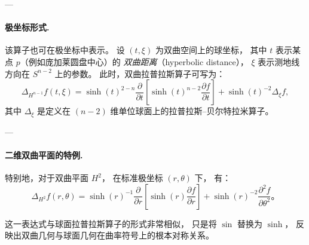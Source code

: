 ---

\paragraph{极坐标形式.}
该算子也可在极坐标中表示。
设 $(t, \xi)$ 为双曲空间上的球坐标，
其中 $t$ 表示某点 $p$（例如庞加莱圆盘中心）的
\emph{双曲距离}（hyperbolic distance），
$\xi$ 表示测地线方向在 $S^{n-2}$ 上的参数。
此时，双曲拉普拉斯算子可写为：
\[
\Delta_{H^{n-1}} f(t, \xi)
= \sinh(t)^{2-n}
  \frac{\partial}{\partial t}
  \left[ \sinh(t)^{n-2} \frac{\partial f}{\partial t} \right]
+ \sinh(t)^{-2} \Delta_{\xi} f,
\]
其中 $\Delta_{\xi}$ 是定义在 $(n-2)$ 维单位球面上的拉普拉斯–贝尔特拉米算子。

---

\paragraph{二维双曲平面的特例.}
特别地，对于双曲平面 $H^{2}$，
在标准极坐标 $(r, \theta)$ 下，
有：
\[
\Delta_{H^{2}} f(r, \theta)
= \sinh(r)^{-1}
  \frac{\partial}{\partial r}
  \left[ \sinh(r) \frac{\partial f}{\partial r} \right]
+ \sinh(r)^{-2}
  \frac{\partial^{2} f}{\partial \theta^{2}}。
\]

这一表达式与球面拉普拉斯算子的形式非常相似，
只是将 $\sin$ 替换为 $\sinh$，
反映出双曲几何与球面几何在曲率符号上的根本对称关系。

